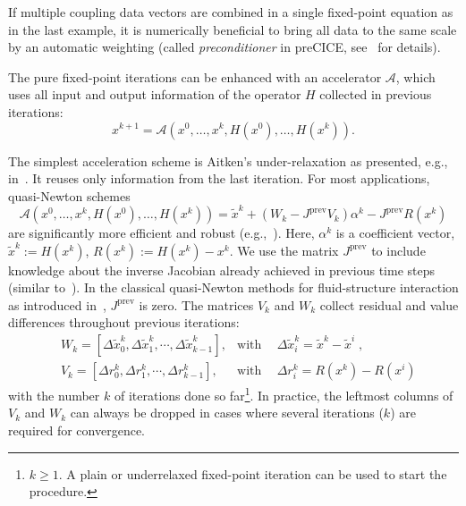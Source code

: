 If multiple coupling data vectors are combined in a single fixed-point equation as in the last example, it is numerically beneficial to bring all data to the same scale by an automatic weighting (called \textit{preconditioner} in preCICE, see~\cite{Uekermann2016} for details). 

The pure fixed-point iterations can be enhanced with an accelerator $\mathcal{A}$, which uses all input and output information of the operator $H$ collected in previous iterations:
\begin{equation*}
x^{k+1}  =  \mathcal{A}(x^0,\ldots, x^k, H(x^0), \ldots, H(x^k)).
\end{equation*}

The simplest acceleration scheme is Aitken's under-relaxation as presented, e.g., in~\cite{Kuettler2008}.
It reuses only information from the last iteration. For most applications, quasi-Newton schemes  
\begin{equation}
\mathcal{A}(x^0,\ldots, x^k, H(x^0), \ldots, H(x^k)) = \tilde{x}^k + \left( W_k - J^{\text{prev}} V_k\right) \alpha^k - J^{\text{prev}} R(x^k) \label{eq:QN}
\end{equation}
are significantly more efficient and robust (e.g.,~\cite{Uekermann2016}). Here, $\alpha^k$ is a coefficient vector, $\tilde{x}^k := H(x^k)$, $R(x^k) := H(x^k)-x^k$.
We use the matrix $J^{\text{prev}}$ to include knowledge about the inverse Jacobian already achieved in previous time steps (similar to~\cite{Bogaers2014_MVQN}).
In the classical quasi-Newton methods for fluid-structure interaction as introduced in~\cite{Degroote2009}, $J^{\text{prev}}$ is zero. 
The matrices $V_k$ and $W_k$ collect residual and value differences throughout previous iterations:
\begin{eqnarray*}
  ~~~~~ W_k = \left[\Delta \tilde{x}^k_0, \Delta
  \tilde{x}^k_{1}, \cdots , \Delta \tilde{x}^k_{k-1}\right],   &\mbox{with}
                                                               ~~  &\Delta \tilde{x}^k_i = \tilde{x}^k - \tilde{x}^i \;,\\
  ~~~~~ V_k = \left[\Delta r^k_0, \Delta r^k_{1}, \cdots
  , \Delta r^k_{k-1}\right],   &\mbox{with} ~~  &\Delta r^k_i = R(x^k) -
                                                  R(x^i)\;
\end{eqnarray*} 
with the number $k$ of iterations done so far\footnote{$k\geq 1$. A plain or underrelaxed fixed-point iteration can be used to start the procedure.}. 
In practice, the leftmost columns of $V_k$ and $W_k$ can always be dropped in cases where several iterations ($k$) are required for convergence.

